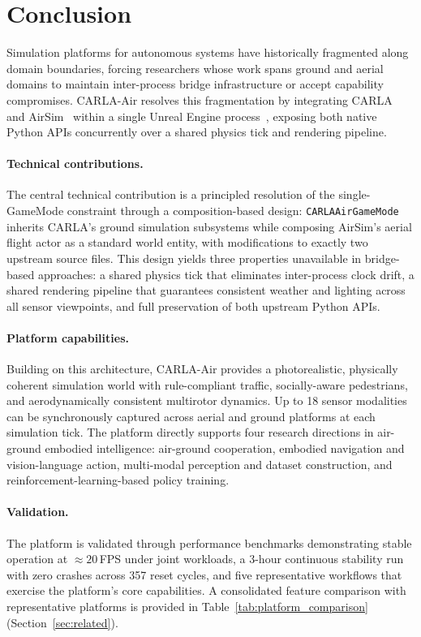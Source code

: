 \section{Conclusion}
\label{sec:conclusion}

Simulation platforms for autonomous systems have historically fragmented along
domain boundaries, forcing researchers whose work spans ground and aerial
domains to maintain inter-process bridge infrastructure or accept capability
compromises.
CARLA-Air resolves this fragmentation by integrating CARLA~\cite{carla} and
AirSim~\cite{airsim} within a single Unreal Engine process~\cite{ue4},
exposing both native Python APIs concurrently over a shared physics tick and
rendering pipeline.

\paragraph{Technical contributions.}
The central technical contribution is a principled resolution of the
single-GameMode constraint through a composition-based design:
\texttt{CARLAAirGameMode} inherits CARLA's ground simulation subsystems while
composing AirSim's aerial flight actor as a standard world entity, with
modifications to exactly two upstream source files.
This design yields three properties unavailable in bridge-based approaches: a
shared physics tick that eliminates inter-process clock drift, a shared
rendering pipeline that guarantees consistent weather and lighting across all
sensor viewpoints, and full preservation of both upstream Python APIs.

\paragraph{Platform capabilities.}
Building on this architecture, CARLA-Air provides a photorealistic, physically
coherent simulation world with rule-compliant traffic, socially-aware
pedestrians, and aerodynamically consistent multirotor dynamics.
Up to 18 sensor modalities can be synchronously captured across aerial and
ground platforms at each simulation tick.
The platform directly supports four research directions in air-ground embodied
intelligence: air-ground cooperation, embodied navigation and vision-language
action, multi-modal perception and dataset construction, and
reinforcement-learning-based policy training.

\paragraph{Validation.}
The platform is validated through performance benchmarks demonstrating stable
operation at ${\approx}20$\,FPS under joint workloads, a 3-hour continuous
stability run with zero crashes across 357 reset cycles, and five
representative workflows that exercise the platform's core capabilities.
A consolidated feature comparison with representative platforms is provided in
Table~\ref{tab:platform_comparison} (Section~\ref{sec:related}).

